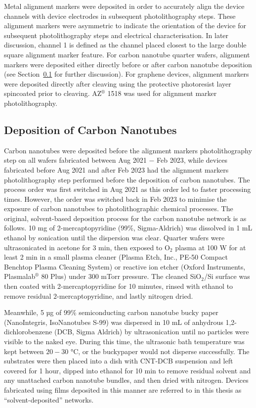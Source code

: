 \documentclass[
  a4paper,
]{scrbook}
\begin{document}
Metal alignment markers were deposited in order to accurately align the
device channels with device electrodes in subsequent photolithography
steps. These alignment markers were asymmetric to indicate the
orientation of the device for subsequent photolithography steps and
electrical characterisation. In later discussion, channel 1 is defined
as the channel placed closest to the large double square alignment
marker feature. For carbon nanotube quarter wafers, alignment markers
were deposited either directly before or after carbon nanotube
deposition (see Section~\ref{sec-dep-carbon-nanotubes} for further
discussion). For graphene devices, alignment markers were deposited
directly after cleaving using the protective photoresist layer
spincoated prior to cleaving. AZ\(^\circledR\) 1518 was used for
alignment marker photolithography.

\hypertarget{sec-dep-carbon-nanotubes}{%
\subsection{Deposition of Carbon
Nanotubes}\label{sec-dep-carbon-nanotubes}}

Carbon nanotubes were deposited before the alignment markers
photolithography step on all wafers fabricated between Aug 2021 \(-\)
Feb 2023, while devices fabricated before Aug 2021 and after Feb 2023
had the alignment markers photolithography step performed before the
deposition of carbon nanotubes. The process order was first switched in
Aug 2021 as this order led to faster processing times. However, the
order was switched back in Feb 2023 to minimise the exposure of carbon
nanotubes to photolithographic chemical processes. The original,
solvent-based deposition process for the carbon nanotube network is as
follows. 10 mg of 2-mercaptopyridine (99\%, Sigma-Aldrich) was dissolved
in 1 mL ethanol by sonication until the dispersion was clear. Quarter
wafers were ultrasonicated in acetone for 3 min, then exposed to O\(_2\)
plasma at 100 W for at least 2 min in a small plasma cleaner (Plasma
Etch, Inc., PE-50 Compact Benchtop Plasma Cleaning System) or reactive
ion etcher (Oxford Instruments, Plasmalab\(^\circledR\) 80 Plus) under
300 mTorr pressure. The cleaned SiO\(_2\)/Si surface was then coated
with 2-mercaptopyridine for 10 minutes, rinsed with ethanol to remove
residual \(2\)-mercaptopyridine, and lastly nitrogen dried.

Meanwhile, 5 µg of 99\% semiconducting carbon nanotube bucky paper
(NanoIntegris, IsoNanotubes S-99) was dispersed in 10 mL of anhydrous
1,2-dichlorobenzene (DCB, Sigma Aldrich) by ultrasonication until no
particles were visible to the naked eye. During this time, the
ultrasonic bath temperature was kept between \(20-30\) °C, or the
buckypaper would not disperse successfully. The substrates were then
placed into a dish with CNT-DCB suspension and left covered for 1 hour,
dipped into ethanol for 10 min to remove residual solvent and any
unattached carbon nanotube bundles, and then dried with nitrogen.
Devices fabricated using films deposited in this manner are referred to
in this thesis as ``solvent-deposited'' networks.
\end{document}
